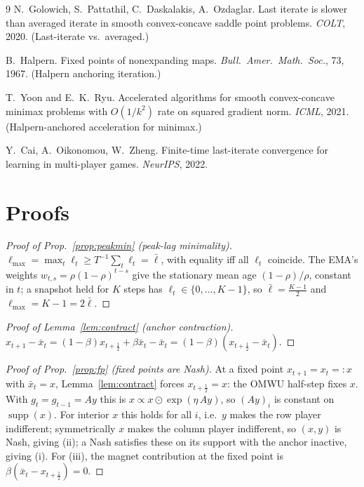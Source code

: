 \documentclass[10pt,twocolumn]{article}
\theoremstyle{plain}
\theoremstyle{remark}
\begin{document}
\begin{thebibliography}{9}
N.~Golowich, S.~Pattathil, C.~Daskalakis, A.~Ozdaglar.
\newblock Last iterate is slower than averaged iterate in smooth convex-concave
saddle point problems.
\newblock \emph{COLT}, 2020. (Last-iterate vs.\ averaged.)

B.~Halpern.
\newblock Fixed points of nonexpanding maps.
\newblock \emph{Bull.\ Amer.\ Math.\ Soc.}, 73, 1967. (Halpern anchoring iteration.)

T.~Yoon and E.~K.~Ryu.
\newblock Accelerated algorithms for smooth convex-concave minimax problems with
$O(1/k^2)$ rate on squared gradient norm.
\newblock \emph{ICML}, 2021. (Halpern-anchored acceleration for minimax.)

Y.~Cai, A.~Oikonomou, W.~Zheng.
\newblock Finite-time last-iterate convergence for learning in multi-player games.
\newblock \emph{NeurIPS}, 2022.
\end{thebibliography}

\appendix

\section{Proofs}
\label{app:proofs}

\begin{proof}[Proof of Prop.~\ref{prop:peakmin} (peak-lag minimality)]
$\ell_{\max}=\max_t\ell_t\ge T^{-1}\!\sum_t\ell_t=\bar\ell$, with equality iff all
$\ell_t$ coincide. The EMA's weights $w_{t,s}=\rho(1-\rho)^{t-s}$ give the stationary
mean age $(1-\rho)/\rho$, constant in $t$; a snapshot held for $K$ steps has
$\ell_t\in\{0,\dots,K\!-\!1\}$, so $\bar\ell=\tfrac{K-1}{2}$ and
$\ell_{\max}=K\!-\!1=2\bar\ell$.
\end{proof}

\begin{proof}[Proof of Lemma~\ref{lem:contract} (anchor contraction)]
$x_{t+1}-\bar x_t = (1-\beta)x_{t+\frac12}+\beta\bar x_t-\bar x_t
= (1-\beta)(x_{t+\frac12}-\bar x_t)$.
\end{proof}

\begin{proof}[Proof of Prop.~\ref{prop:fp} (fixed points are Nash)]
At a fixed point $x_{t+1}=x_t=:x$ with $\bar x_t=x$, Lemma~\ref{lem:contract} forces
$x_{t+\frac12}=x$: the OMWU half-step fixes $x$. With $g_t=g_{t-1}=Ay$ this is
$x\propto x\odot\exp(\eta\,Ay)$, so $(Ay)_i$ is constant on $\operatorname{supp}(x)$.
For interior $x$ this holds for all $i$, i.e.\ $y$ makes the row player indifferent;
symmetrically $x$ makes the column player indifferent, so $(x,y)$ is Nash, giving
(ii); a Nash satisfies these on its support with the anchor inactive, giving (i).
For (iii), the magnet contribution at the fixed point is
$\beta(\bar x_t-x_{t+\frac12})=0$.
\end{proof}
\end{document}
